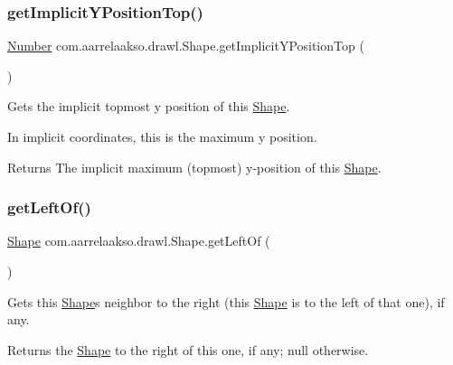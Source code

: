 \subsubsection{\texorpdfstring{get\+Implicit\+Y\+Position\+Top()}{getImplicitYPositionTop()}}
{\footnotesize\ttfamily \hyperlink{interfacecom_1_1aarrelaakso_1_1drawl_1_1_number}{Number} com.\+aarrelaakso.\+drawl.\+Shape.\+get\+Implicit\+Y\+Position\+Top (\begin{DoxyParamCaption}{ }\end{DoxyParamCaption})\hspace{0.3cm}{\ttfamily [protected]}}



Gets the implicit topmost y position of this \hyperlink{classcom_1_1aarrelaakso_1_1drawl_1_1_shape}{Shape}. 

In implicit coordinates, this is the maximum y position.

\begin{DoxyReturn}{Returns}
The implicit maximum (topmost) y-\/position of this \hyperlink{classcom_1_1aarrelaakso_1_1drawl_1_1_shape}{Shape}. 
\end{DoxyReturn}
\mbox{\label{classcom_1_1aarrelaakso_1_1drawl_1_1_shape_a2b19d5964ac46d545a7bae3133df6532}} 
\subsubsection{\texorpdfstring{get\+Left\+Of()}{getLeftOf()}}
{\footnotesize\ttfamily \hyperlink{classcom_1_1aarrelaakso_1_1drawl_1_1_shape}{Shape} com.\+aarrelaakso.\+drawl.\+Shape.\+get\+Left\+Of (\begin{DoxyParamCaption}{ }\end{DoxyParamCaption})}



Gets this \hyperlink{classcom_1_1aarrelaakso_1_1drawl_1_1_shape}{Shape}\textquotesingle{}s neighbor to the right (this \hyperlink{classcom_1_1aarrelaakso_1_1drawl_1_1_shape}{Shape} is to the left of that one), if any. 

\begin{DoxyReturn}{Returns}
the \hyperlink{classcom_1_1aarrelaakso_1_1drawl_1_1_shape}{Shape} to the right of this one, if any; {\ttfamily null} otherwise. 
\end{DoxyReturn}
\mbox{\label{classcom_1_1aarrelaakso_1_1drawl_1_1_shape_aeffa96786ca552adf46924ec77da9555}} 
